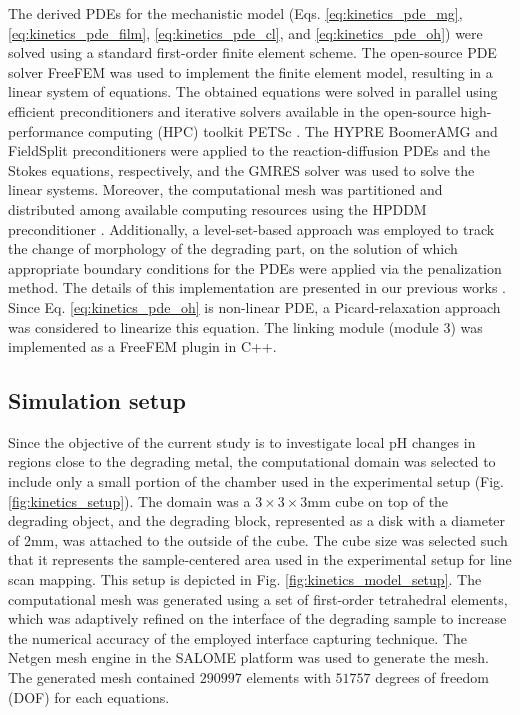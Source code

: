 The derived \gls{PDE}s for the mechanistic model (Eqs. \ref{eq:kinetics_pde_mg}, \ref{eq:kinetics_pde_film}, \ref{eq:kinetics_pde_cl}, and \ref{eq:kinetics_pde_oh}) were solved using a standard first-order finite element scheme. The open-source \gls{PDE} solver FreeFEM \cite{Hecht2012} was used to implement the finite element model, resulting in a linear system of equations. The obtained equations were solved in parallel using efficient preconditioners and iterative solvers available in the open-source high-performance computing (\gls{HPC}) toolkit \gls{PETSc} \cite{petsc}. The HYPRE BoomerAMG \cite{Falgout2002} and FieldSplit preconditioners were applied to the reaction-diffusion \gls{PDE}s and the Stokes equations, respectively, and the \gls{GMRES} solver \cite{Saad1986} was used to solve the linear systems. Moreover, the computational mesh was partitioned and distributed among available computing resources using the \gls{HPDDM} preconditioner \cite{Jolivet2013}. Additionally, a level-set-based approach was employed to track the change of morphology of the degrading part, on the solution of which appropriate boundary conditions for the \gls{PDE}s were applied via the penalization method. The details of this implementation are presented in our previous works \cite{Barzegari2021, Barzegari2022}. Since Eq. \ref{eq:kinetics_pde_oh} is non-linear \gls{PDE}, a Picard-relaxation approach was considered to linearize this equation. The linking module (module 3) was implemented as a FreeFEM plugin in C++.

\subsection{Simulation setup}

Since the objective of the current study is to investigate local pH changes in regions close to the degrading metal, the computational domain was selected to include only a small portion of the chamber used in the experimental setup (Fig. \ref{fig:kinetics_setup}). The domain was a $3\times3\times3\text{mm}$ cube on top of the degrading object, and the degrading block, represented as a disk with a diameter of $2 \text{mm}$, was attached to the outside of the cube. The cube size was selected such that it represents the sample-centered area used in the experimental setup for line scan mapping. This setup is depicted in Fig. \ref{fig:kinetics_model_setup}. The computational mesh was generated using a set of first-order tetrahedral elements, which was adaptively refined on the interface of the degrading sample to increase the numerical accuracy of the employed interface capturing technique. The Netgen mesh engine \cite{Schoeberl1997} in the SALOME platform \cite{Ribes2007} was used to generate the mesh. The generated mesh contained $\num{290997}$ elements with $\num{51757}$ degrees of freedom (\gls{DOF}) for each equations.


